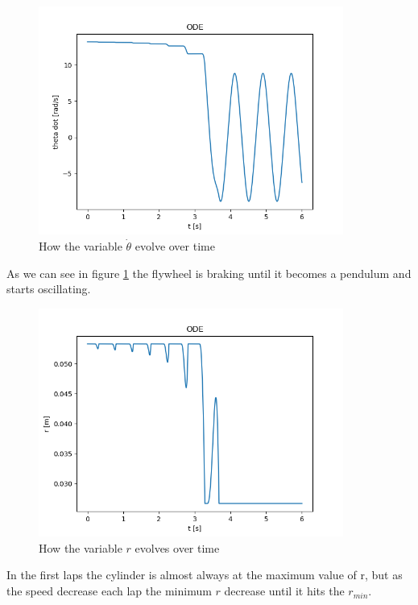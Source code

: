 \begin{figure}[H]
	\centering
	\includegraphics[width=10cm]{img/simulation/d_theta_t.png}
	\caption{How the variable $\dot{\theta}$ evolve over time}
	\label{fig:d theta t diagram}
\end{figure}
As we can see in figure \ref{fig:d theta t diagram} the flywheel is braking until it becomes a pendulum and starts oscillating.

\begin{figure}[H]
	\centering
	\includegraphics[width=10cm]{img/simulation/r_t.png}
	\caption{How the variable $r$ evolves over time}
	\label{fig:r t diagram}
\end{figure}
In the first laps the cylinder is almost always at the maximum value of r, but as the speed decrease each lap the minimum $r$ decrease until it hits the $r_{min}$.

